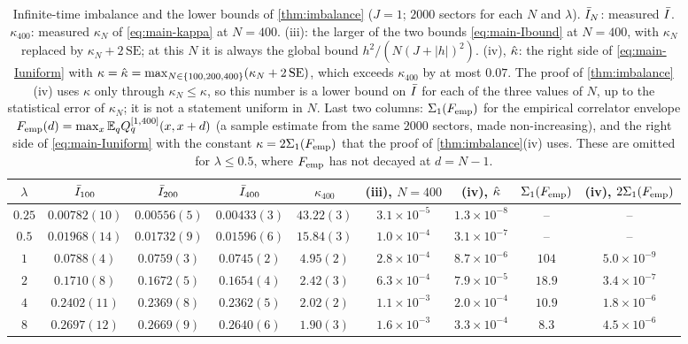 \begin{table}[tbp]
\centering
\small
\setlength{\tabcolsep}{3pt}
\begin{tabular}{c|ccc|c|cc|cc}
$\lambda$ & $\bar I_{100}$ & $\bar I_{200}$ & $\bar I_{400}$ & $\kappa_{400}$ & (iii), $N=400$ & (iv), $\hat\kappa$
 & $\Sigma_1(F_{\mathrm{emp}})$ & (iv), $2\Sigma_1(F_{\mathrm{emp}})$\\\hline
$0.25$ & $0.00782(10)$ & $0.00556(5)$ & $0.00433(3)$ & $43.22(3)$ & $3.1\times10^{-5}$ & $1.3\times10^{-8}$ & -- & --\\
$0.5$ & $0.01968(14)$ & $0.01732(9)$ & $0.01596(6)$ & $15.84(3)$ & $1.0\times10^{-4}$ & $3.1\times10^{-7}$ & -- & --\\
$1$ & $0.0788(4)$ & $0.0759(3)$ & $0.0745(2)$ & $4.95(2)$ & $2.8\times10^{-4}$ & $8.7\times10^{-6}$ & $104$ & $5.0\times10^{-9}$\\
$2$ & $0.1710(8)$ & $0.1672(5)$ & $0.1654(4)$ & $2.42(3)$ & $6.3\times10^{-4}$ & $7.9\times10^{-5}$ & $18.9$ & $3.4\times10^{-7}$\\
$4$ & $0.2402(11)$ & $0.2369(8)$ & $0.2362(5)$ & $2.02(2)$ & $1.1\times10^{-3}$ & $2.0\times10^{-4}$ & $10.9$ & $1.8\times10^{-6}$\\
$8$ & $0.2697(12)$ & $0.2669(9)$ & $0.2640(6)$ & $1.90(3)$ & $1.6\times10^{-3}$ & $3.3\times10^{-4}$ & $8.3$ & $4.5\times10^{-6}$
\end{tabular}
\caption{Infinite-time imbalance and the lower bounds of \cref{thm:imbalance} ($J=1$; $2000$ sectors for each
$N$ and $\lambda$).  $\bar I_N$: measured $\bar I$.  $\kappa_{400}$: measured $\kappa_N$ of \eqref{eq:main-kappa} at $N=400$.
(iii): the larger of the two bounds \eqref{eq:main-Ibound} at $N=400$, with $\kappa_N$ replaced by
$\kappa_N+2\,\mathrm{SE}$; at this $N$ it is always the global bound $h^2/(N(J+|h|)^2)$.  (iv), $\hat\kappa$: the right
side of \eqref{eq:main-Iuniform} with $\kappa=\hat\kappa=\max_{N\in\{100,200,400\}}(\kappa_N+2\,\mathrm{SE})$, which exceeds
$\kappa_{400}$ by at most $0.07$.  The proof
of \cref{thm:imbalance}(iv) uses $\kappa$ only through $\kappa_N\le\kappa$, so this number is a lower bound on $\bar I$
for each of the three values of $N$, up to the statistical error of $\kappa_N$; it is not a statement uniform in $N$.  Last
two columns: $\Sigma_1(F_{\mathrm{emp}})$ for the empirical correlator envelope $F_{\mathrm{emp}}(d)=\max_x\mathbb{E}_qQ^{[1,400]}_q(x,x+d)$ (a sample
estimate from the same $2000$ sectors, made non-increasing), and the right side of \eqref{eq:main-Iuniform} with the constant $\kappa=2\Sigma_1(F_{\mathrm{emp}})$ that the
proof of \cref{thm:imbalance}(iv) uses.  These are omitted for $\lambda\le0.5$, where $F_{\mathrm{emp}}$ has not decayed at
$d=N-1$.}
\label{tab:numerics-imbalance}
\end{table}


